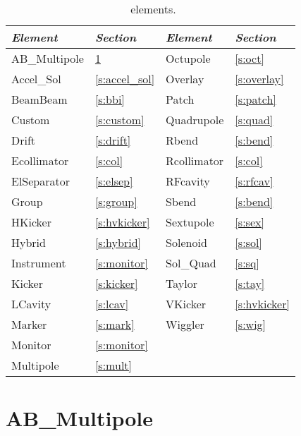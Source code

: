 \begin{table}[h]
\centering
{\tt
\begin{tabular}{|l|l||l|l|} \hline
  {\it Element} & {\it Section}     & {\it Element} & {\it Section}    \\ \hline
  AB\_Multipole & \ref{s:ab_m}      &  Octupole     & \ref{s:oct}      \\ \hline
  Accel\_Sol    & \ref{s:accel_sol} &  Overlay      & \ref{s:overlay}  \\ \hline
  BeamBeam      & \ref{s:bbi}       &  Patch        & \ref{s:patch}    \\ \hline
  Custom        & \ref{s:custom}    &  Quadrupole   & \ref{s:quad}     \\ \hline
  Drift         & \ref{s:drift}     &  Rbend        & \ref{s:bend}     \\ \hline
  Ecollimator   & \ref{s:col}       &  Rcollimator  & \ref{s:col}      \\ \hline
  ElSeparator   & \ref{s:elsep}     &  RFcavity     & \ref{s:rfcav}    \\ \hline
  Group         & \ref{s:group}     &  Sbend        & \ref{s:bend}     \\ \hline
  HKicker       & \ref{s:hvkicker}  &  Sextupole    & \ref{s:sex}      \\ \hline
  Hybrid        & \ref{s:hybrid}    &  Solenoid     & \ref{s:sol}      \\ \hline
  Instrument    & \ref{s:monitor}   &  Sol\_Quad    & \ref{s:sq}       \\ \hline
  Kicker        & \ref{s:kicker}    &  Taylor       & \ref{s:tay}      \\ \hline
  LCavity       & \ref{s:lcav}      &  VKicker      & \ref{s:hvkicker} \\ \hline
  Marker        & \ref{s:mark}      &  Wiggler      & \ref{s:wig}      \\ \hline
  Monitor       & \ref{s:monitor}   &               &                  \\ \hline
  Multipole     & \ref{s:mult}      &               &                  \\ \hline
\end{tabular}
}
\caption{\bmad\ elements.}
\label{tab:elements}\center
\end{table}

\vfil
\break

\section{AB\_Multipole}
\label{s:ab_m}

